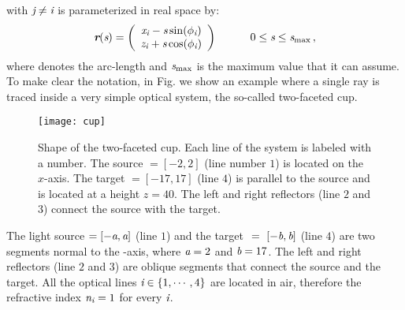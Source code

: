 with $\textit{j}\neq\textit{i}$ is parameterized in real space by:
\begin{equation}
\label{parametrization}
\textit{\textbf{r}}(\textit{s})=
\left( \begin{array}{cc}
\textit{x}_{\textit{i}}-\textit{s}\sin(\phi_{\textit{i}}) \\
\textit{z}_{\textit{i}}+\textit{s}\cos(\phi_{\textit{i}})\end{array} \right) \qquad \quad 0\leq \textit{s}\leq \textit{s}_{\textrm{max}}\,,
\end{equation}
where  denotes the arc-length and $\textit{s}_{\textrm{max}}$ is the maximum value that it can assume. 
To make clear the notation, in Fig. we show an example where a single ray is traced inside a very simple optical system, the so-called two-faceted cup. 
\begin{figure}[h]
\label{figure:cup}
  \begin{center}
  \texttt{[image: cup]}
  \end{center}
  \caption{\footnotesize{Shape of the two-faceted cup.  Each line of the system is labeled with a number.
   The source $= [-2,2]$ (line number $1$) is located on the $x$-axis.
   The target $= [-17, 17]$ (line $4$) is parallel to the source and is located at a height $ z= 40$.
   The left and right reflectors (line $2$ and $3$) connect the source with the target.}}
  \label{figure:cup}
\end{figure}
The light source $= [-\textit{a}, \textit{a}]$ (line $1$) and the target $~=~ [-\textit{b}, \textit{b}]$ (line $4$) are two segments normal to the -axis, where $\textit{a}=2$ and $\textit{b}=17$.
The left and right reflectors (line $2$ and $3$) are oblique segments that connect the source and the target.
All the optical lines $\textit{i} \in \{1, \cdots, 4\}$  are located in air, therefore the refractive index $\textit{n}_{\textit{i}}=1$ for every $\textit{i}$.  
